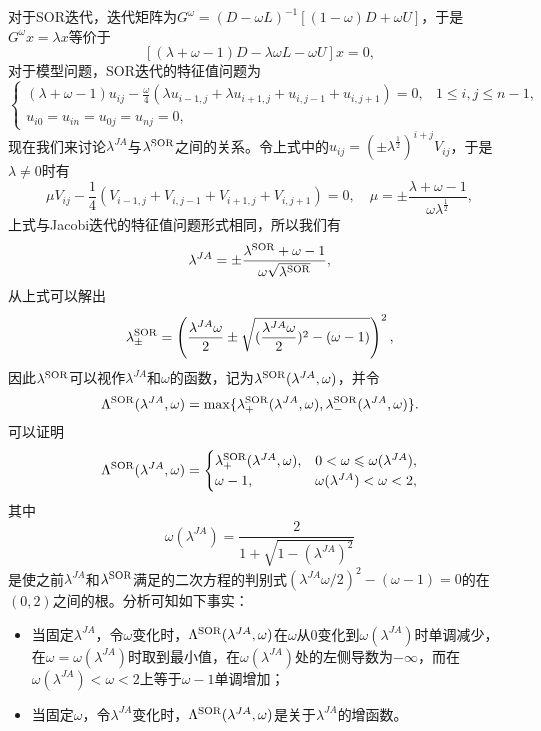\documentclass[a4paper,10pt]{ctexart}
\begin{document}
对于SOR迭代，迭代矩阵为$ G^{\omega} = (D-\omega L)^{-1}[(1-\omega) D + \omega U] $，于是$ G^\omega x = \lambda x $等价于
\[
    [(\lambda + \omega - 1)D - \lambda \omega L - \omega U]x = 0,
\]
对于模型问题，SOR迭代的特征值问题为
\[
    \begin{cases}
        (\lambda+\omega-1)u_{ij} - \frac{\omega}{4}(\lambda u_{i-1,j} + \lambda u_{i+1,j} + u_{i,j-1} + u_{i,j+1}) = 0, & 1\leqslant i,j\leqslant n-1,\\
        u_{i0} = u_{in} = u_{0j} = u_{nj} = 0,
    \end{cases}
\]
现在我们来讨论$ \lambda^{JA} $与$ \lambda^{\rm SOR} $之间的关系。令上式中的$ u_{ij} = (\pm \lambda^{\frac{1}{2}})^{i+j} V_{ij} $，于是$ \lambda\ne 0 $时有
\[
    \mu V_{ij} - \frac{1}{4}(V_{i-1,j}+V_{i,j-1}+V_{i+1,j}+V_{i,j+1})=0,\quad \mu = \pm \frac{\lambda + \omega - 1}{\omega \lambda^{\frac{1}{2}}},
\]
上式与Jacobi迭代的特征值问题形式相同，所以我们有
\[
    \lambda^{JA} = \pm \frac{\lambda^{\rm SOR} + \omega - 1}{\omega \sqrt{\lambda^{\rm SOR}} },
\]
从上式可以解出
\[
    \lambda^{\rm SOR}_{\pm} = \left( \frac{\lambda^{JA}\omega}{2} \pm \sqrt{(\frac{\lambda^{JA}\omega}{2})^2 - (\omega-1)}  \right)^2,
\]
因此$ \lambda^{\rm SOR} $可以视作$ \lambda^{JA} $和$ \omega $的函数，记为$ \lambda^{\rm SOR}(\lambda^{JA}, \omega) $，并令
\[
    \Lambda^{\rm SOR}(\lambda^{JA}, \omega) = \max\{\lambda_+^{\rm SOR}(\lambda^{JA}, \omega),\lambda_-^{\rm SOR}(\lambda^{JA}, \omega)\}.
\]
可以证明
\[
    \Lambda^{\rm SOR}(\lambda^{JA}, \omega) = 
    \begin{cases}
        \lambda_+^{\rm SOR}(\lambda^{JA}, \omega), & 0< \omega\leqslant \omega(\lambda^{JA}),\\
        \omega-1, & \omega(\lambda^{JA}) < \omega <2,
    \end{cases}
\]
其中
\[
    \omega(\lambda^{JA}) = \frac{2}{1 + \sqrt{1-(\lambda^{JA})^2} }
\]
是使之前$ \lambda^{JA} $和$ \lambda^{\rm SOR} $满足的二次方程的判别式$ (\lambda^{JA}\omega / 2)^2 - (\omega-1) = 0 $的在$ (0,2) $之间的根。分析可知如下事实：
\begin{itemize}
    \item 当固定$ \lambda^{JA} $，令$ \omega $变化时，$ \Lambda^{\rm SOR}(\lambda^{JA}, \omega) $在$ \omega $从$ 0 $变化到$ \omega(\lambda^{JA}) $时单调减少，在$ \omega = \omega(\lambda^{JA}) $时取到最小值，在$ \omega(\lambda^{JA}) $处的左侧导数为$ -\infty $，而在$ \omega(\lambda^{JA}) < \omega <2 $上等于$ \omega-1 $单调增加；
    \item 当固定$ \omega $，令$ \lambda^{JA} $变化时，$ \Lambda^{\rm SOR}(\lambda^{JA}, \omega) $是关于$ \lambda^{JA} $的增函数。
\end{itemize}
\end{document}
